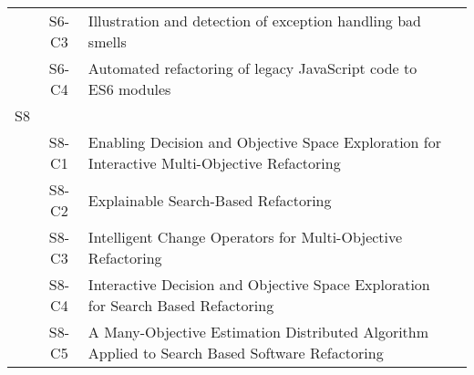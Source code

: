 \begin{longtable}{ccp{9cm}p{3cm}}
    & S6-C3   & Illustration and detection of exception handling bad smells                                                                                                                                                                                    & \citeauthor*{Tarwani2021}     \\
    & S6-C4   & Automated refactoring of legacy JavaScript code to ES6 modules                                                                                                                                                                                 & \citeauthor*{Paltoglou2021}   \\
S8  &        &                                                                                                                                                                                                                                               &                                 \\
    & S8-C1   & Enabling Decision and Objective Space Exploration for Interactive Multi-Objective Refactoring                                                                                                                                                  & \citeauthor*{Rebai2020}       \\
    & S8-C2   & Explainable Search-Based Refactoring                                                                                                                                                                                                           & \citeauthor*{Abid2021c}       \\
    & S8-C3   & Intelligent Change Operators for Multi-Objective Refactoring                                                                                                                                                                                   & \citeauthor*{Abid2021a}       \\
    & S8-C4   & Interactive Decision and Objective Space Exploration for Search Based Refactoring                                                                                                                                                              & \citeauthor*{Rebai2019}       \\
    & S8-C5   & A Many-Objective Estimation Distributed Algorithm Applied to Search Based Software Refactoring                                                                                                                                                 & \citeauthor*{Botelho2018}     \\

\end{longtable}
